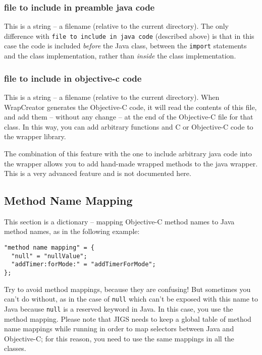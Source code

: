 \subsubsection{file to include in preamble java code}
This is a string -- a filename (relative to the current directory).
The only difference with \texttt{file to include in java code}
(described above) is that in this case the code is included {\em
before} the Java class, between the \texttt{import} statements and the
class implementation, rather than {\em inside} the class
implementation.

\subsubsection{file to include in objective-c code}
This is a string -- a filename (relative to the current directory).
When WrapCreator generates the Objective-C code, it will read the
contents of this file, and add them -- without any change -- at the
end of the Objective-C file for that class.  In this way, you can add
arbitrary functions and C or Objective-C code to the wrapper library.

The combination of this feature with the one to include arbitrary java
code into the wrapper allows you to add hand-made wrapped methods to
the java wrapper.  This is a very advanced feature and is not
documented here.

\subsection{Method Name Mapping}
This section is a dictionary -- mapping Objective-C method names 
to Java method names, as in the following example:
\begin{verbatim}
"method name mapping" = {
  "null" = "nullValue";
  "addTimer:forMode:" = "addTimerForMode";
};
\end{verbatim}
Try to avoid method mappings, because they are confusing!  But
sometimes you can't do without, as in the case of \texttt{null} which
can't be exposed with this name to Java because \texttt{null} is a
reserved keyword in Java.  In this case, you use the method mapping.
Please note that JIGS needs to keep a global table of method name
mappings while running in order to map selectors between Java and
Objective-C; for this reason, you need to use the same mappings in all
the classes.

